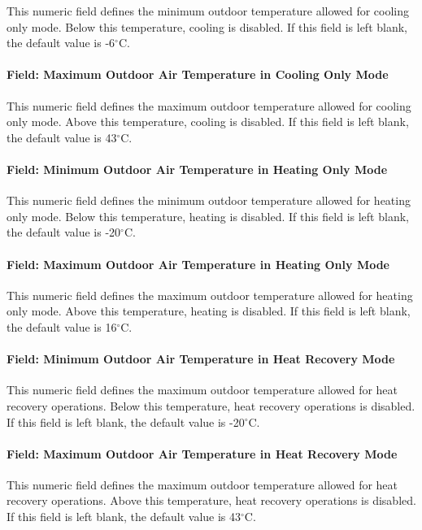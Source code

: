 This numeric field defines the minimum outdoor temperature allowed for cooling only mode. Below this temperature, cooling is disabled. If this field is left blank, the default value is -6$^\circ$C.

\paragraph{Field: Maximum Outdoor Air Temperature in Cooling Only Mode}

This numeric field defines the maximum outdoor temperature allowed for cooling only mode. Above this temperature, cooling is disabled. If this field is left blank, the default value is 43$^\circ$C.

\paragraph{Field: Minimum Outdoor Air Temperature in Heating Only Mode}

This numeric field defines the minimum outdoor temperature allowed for heating only mode. Below this temperature, heating is disabled. If this field is left blank, the default value is -20$^\circ$C.

\paragraph{Field: Maximum Outdoor Air Temperature in Heating Only Mode}

This numeric field defines the maximum outdoor temperature allowed for heating only mode. Above this temperature, heating is disabled. If this field is left blank, the default value is 16$^\circ$C.

\paragraph{Field: Minimum Outdoor Air Temperature in Heat Recovery Mode}

This numeric field defines the maximum outdoor temperature allowed for heat recovery operations. Below this temperature, heat recovery operations is disabled. If this field is left blank, the default value is -20$^\circ$C.

\paragraph{Field: Maximum Outdoor Air Temperature in Heat Recovery Mode}

This numeric field defines the maximum outdoor temperature allowed for heat recovery operations. Above this temperature, heat recovery operations is disabled. If this field is left blank, the default value is 43$^\circ$C.

